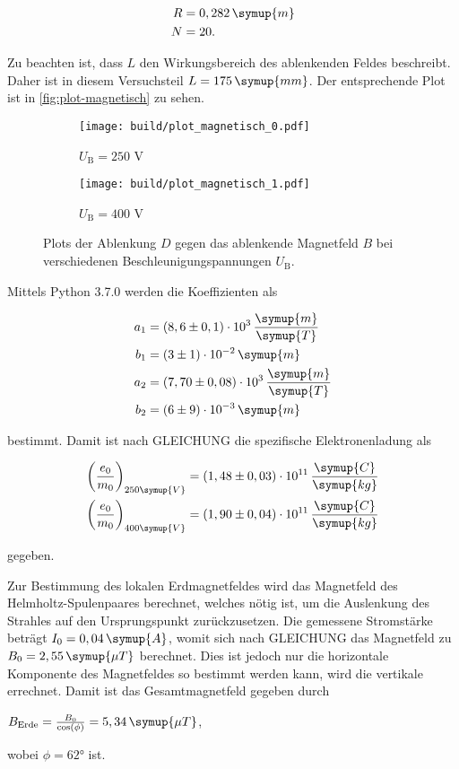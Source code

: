 \begin{align*}
  R &= 0,282 \, \symup{m} \\
  N &= 20.
\end{align*}

Zu beachten ist, dass $L$ den Wirkungsbereich des ablenkenden Feldes beschreibt.
Daher ist in diesem Versuchsteil $L = 175 \, \symup{mm}$.
Der entsprechende Plot ist in \autoref{fig:plot-magnetisch} zu sehen.

\begin{figure}
  \centering
  \begin{subfigure}{0.49\textwidth}
    \centering
    \texttt{[image: build/plot\_magnetisch\_0.pdf]}
    \caption{$U_\text{B} = 250$ V}
  \end{subfigure}
  \begin{subfigure}{0.49\textwidth}
    \centering
    \texttt{[image: build/plot\_magnetisch\_1.pdf]}
    \caption{$U_\text{B} = 400$ V}
  \end{subfigure}
  \caption{Plots der Ablenkung $D$ gegen das ablenkende Magnetfeld $B$ bei verschiedenen Beschleunigungspannungen $U_\text{B}$.}
  \label{fig:plot-magnetisch}
\end{figure}

Mittels Python 3.7.0 werden die Koeffizienten als

\begin{align*}
  a_1 &= (8,6 \pm 0,1) \cdot 10^{3} \, \frac{\symup{m}}{\symup{T}} \\
  b_1 &= (3 \pm 1) \cdot 10^{-2} \, \symup{m} \\
  a_2 &= (7,70 \pm 0,08) \cdot 10^{3} \, \frac{\symup{m}}{\symup{T}} \\
  b_2 &= (6 \pm 9) \cdot 10^{-3} \, \symup{m}
\end{align*}

bestimmt.
Damit ist nach GLEICHUNG die spezifische Elektronenladung als 

\begin{align*}
  \bigg( \frac{e_0}{m_0} \bigg)_{250 \symup{V}} &= (1,48 \pm 0,03) \cdot 10^{11} \, \frac{\symup{C}}{\symup{kg}} \\
  \bigg( \frac{e_0}{m_0} \bigg)_{400 \symup{V}} &= (1,90 \pm 0,04) \cdot 10^{11} \, \frac{\symup{C}}{\symup{kg}}
\end{align*}

gegeben.

Zur Bestimmung des lokalen Erdmagnetfeldes wird das Magnetfeld des Helmholtz-Spulenpaares berechnet, welches nötig ist,
um die Auslenkung des Strahles auf den Ursprungspunkt zurückzusetzen.
Die gemessene Stromstärke beträgt $I_0 = 0,04 \, \symup{A}$, womit sich nach GLEICHUNG das Magnetfeld zu $B_0 = 2,55 \, \symup{\mu T}$ berechnet.
Dies ist jedoch nur die horizontale Komponente des Magnetfeldes so bestimmt werden kann, wird die vertikale errechnet.
Damit ist das Gesamtmagnetfeld gegeben durch

\begin{center}
  $B_\text{Erde} = \frac{B_0}{\cos ( \phi )} = 5,34 \, \symup{\mu T}$,
\end{center}

wobei $\phi = 62°$ ist.